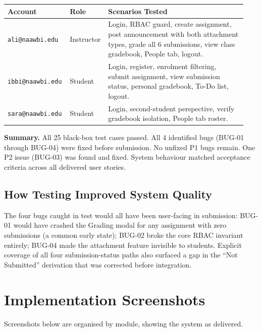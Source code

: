 \documentclass[12pt, a4paper]{article}
\newcommand{\fcolplain}[1]{\textbf{#1}}
\begin{document}
\begin{center}
\small\begin{tabular}{@{}p{0.24\linewidth}p{0.12\linewidth}p{0.58\linewidth}@{}}
  \toprule
  \fcolplain{Account} & Role       & Scenarios Tested \\
  \midrule
  \texttt{ali@naawbi.edu}  & Instructor & Login, RBAC guard, create assignment, post announcement with both attachment types, grade all 6 submissions, view class gradebook, People tab, logout. \\
  \texttt{ibbi@naawbi.edu} & Student    & Login, register, enrolment filtering, submit assignment, view submission status, personal gradebook, To-Do list, logout. \\
  \texttt{sara@naawbi.edu} & Student    & Login, second-student perspective, verify gradebook isolation, People tab roster. \\
  \bottomrule
\end{tabular}
\end{center}

\noindent\textbf{Summary.} All 25 black-box test cases passed. All 4 identified
bugs (BUG-01 through BUG-04) were fixed before submission. No unfixed P1 bugs
remain. One P2 issue (BUG-03) was found and fixed. System behaviour matched
acceptance criteria across all delivered user stories.

\subsection{How Testing Improved System Quality}
The four bugs caught in test would all have been user-facing in submission:
BUG-01 would have crashed the Grading modal for any assignment with zero
submissions (a common early state); BUG-02 broke the core RBAC invariant
entirely; BUG-04 made the attachment feature invisible to students. Explicit
coverage of all four submission-status paths also surfaced a gap in the
``Not Submitted'' derivation that was corrected before integration.

\endgroup

\section{Implementation Screenshots}

Screenshots below are organised by module, showing the system as delivered.
\end{document}
